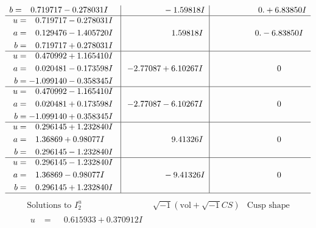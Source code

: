 \documentclass[1p]{elsarticle_modified}
\theoremstyle{definition}
\newcommand{\I}{\sqrt{-1}}
\begin{document}
$$\begin{array}{c|c|c}
\begin{aligned}
b &= \phantom{-}0.719717 - 0.278031 I\end{aligned}
 & \phantom{-0.000000 } -1.59818 I & \phantom{-0.000000 -}0. + 6.83850 I \\ \hline\begin{aligned}
u &= \phantom{-}0.719717 - 0.278031 I \\
a &= \phantom{-}0.129476 - 1.405720 I \\
b &= \phantom{-}0.719717 + 0.278031 I\end{aligned}
 & \phantom{-0.000000 -}1.59818 I & \phantom{-0.000000 } 0. - 6.83850 I \\ \hline\begin{aligned}
u &= \phantom{-}0.470992 + 1.165410 I \\
a &= \phantom{-}0.020481 - 0.173598 I \\
b &= -1.099140 - 0.358345 I\end{aligned}
 & -2.77087 + 6.10267 I & \phantom{-0.000000 } 0 \\ \hline\begin{aligned}
u &= \phantom{-}0.470992 - 1.165410 I \\
a &= \phantom{-}0.020481 + 0.173598 I \\
b &= -1.099140 + 0.358345 I\end{aligned}
 & -2.77087 - 6.10267 I & \phantom{-0.000000 } 0 \\ \hline\begin{aligned}
u &= \phantom{-}0.296145 + 1.232840 I \\
a &= \phantom{-}1.36869 + 0.98077 I \\
b &= \phantom{-}0.296145 - 1.232840 I\end{aligned}
 & \phantom{-0.000000 -}9.41326 I & \phantom{-0.000000 } 0 \\ \hline\begin{aligned}
u &= \phantom{-}0.296145 - 1.232840 I \\
a &= \phantom{-}1.36869 - 0.98077 I \\
b &= \phantom{-}0.296145 + 1.232840 I\end{aligned}
 & \phantom{-0.000000 } -9.41326 I & \phantom{-0.000000 } 0\\
 \hline 
 \end{array}$$\newpage$$\begin{array}{c|c|c}  
\text{Solutions to }I^u_{2}& \I (\text{vol} + \sqrt{-1}CS) & \text{Cusp shape}\\
 \hline 
\begin{aligned}
u &= \phantom{-}0.615933 + 0.370912 I \\

\end{aligned}
\end{array}$$
\end{document}
